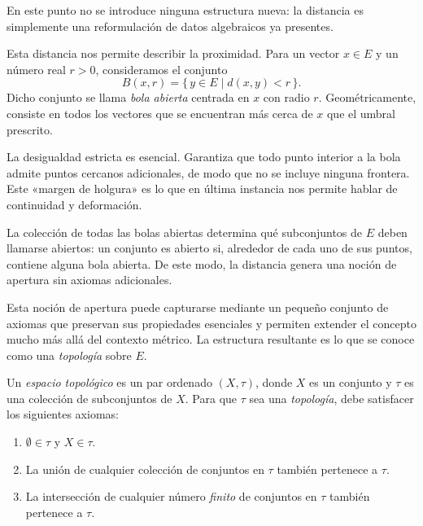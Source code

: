 En este punto no se introduce ninguna estructura nueva: la distancia es
simplemente una reformulación de datos algebraicos ya presentes.

\medskip

Esta distancia nos permite describir la proximidad. Para un vector $x \in E$
y un número real $r > 0$, consideramos el conjunto
\[
B(x,r) = \{\, y \in E \mid d(x,y) < r \,\}.
\]
Dicho conjunto se llama \textit{bola abierta} centrada en $x$ con radio $r$.
Geométricamente, consiste en todos los vectores que se encuentran más cerca
de $x$ que el umbral prescrito.

\medskip

La desigualdad estricta es esencial. Garantiza que todo punto interior a la
bola admite puntos cercanos adicionales, de modo que no se incluye ninguna
frontera.
Este «margen de holgura» es lo que en última instancia nos permite hablar de
continuidad y deformación.

\medskip

La colección de todas las bolas abiertas determina qué subconjuntos de $E$
deben llamarse abiertos: un conjunto es abierto si, alrededor de cada uno de
sus puntos, contiene alguna bola abierta.
De este modo, la distancia genera una noción de apertura sin axiomas adicionales.


\medskip

Esta noción de apertura puede capturarse mediante un pequeño conjunto de
axiomas que preservan sus propiedades esenciales y permiten extender el concepto
mucho más allá del contexto métrico.
La estructura resultante es lo que se conoce como una \textit{topología} sobre $E$.

\medskip

Un \textit{espacio topológico} es un par ordenado $(X, \tau)$, donde $X$ es un
conjunto y $\tau$ es una colección de subconjuntos de $X$.
Para que $\tau$ sea una \textit{topología}, debe satisfacer los siguientes axiomas:

\begin{enumerate}
    \item $\emptyset \in \tau$ y $X \in \tau$.
    \item La unión de cualquier colección de conjuntos en $\tau$ también pertenece a $\tau$.
    \item La intersección de cualquier número \textit{finito} de conjuntos en $\tau$
    también pertenece a $\tau$.
\end{enumerate}

